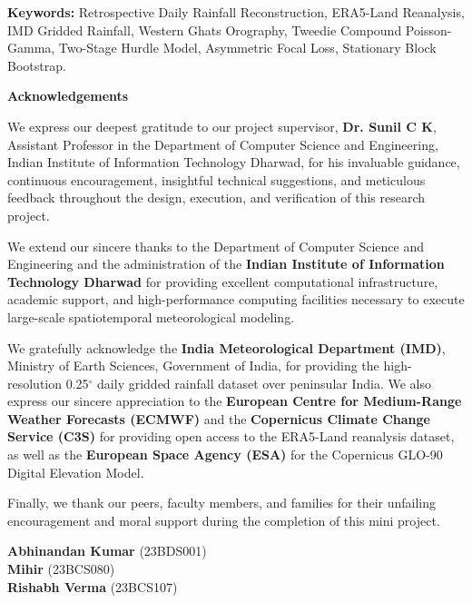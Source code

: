 \documentclass[12pt]{article}
\begin{document}
\vspace{0.8cm}
\noindent \textbf{Keywords:} Retrospective Daily Rainfall Reconstruction, ERA5-Land Reanalysis, IMD Gridded Rainfall, Western Ghats Orography, Tweedie Compound Poisson-Gamma, Two-Stage Hurdle Model, Asymmetric Focal Loss, Stationary Block Bootstrap.

\newpage
\thispagestyle{empty}

\begin{center}
	{\huge \textbf{Acknowledgements}}\\[1.0cm]
\end{center}

\noindent We express our deepest gratitude to our project supervisor, \textbf{Dr. Sunil C K}, Assistant Professor in the Department of Computer Science and Engineering, Indian Institute of Information Technology Dharwad, for his invaluable guidance, continuous encouragement, insightful technical suggestions, and meticulous feedback throughout the design, execution, and verification of this research project.

\vspace{0.6cm}
\noindent We extend our sincere thanks to the Department of Computer Science and Engineering and the administration of the \textbf{Indian Institute of Information Technology Dharwad} for providing excellent computational infrastructure, academic support, and high-performance computing facilities necessary to execute large-scale spatiotemporal meteorological modeling.

\vspace{0.6cm}
\noindent We gratefully acknowledge the \textbf{India Meteorological Department (IMD)}, Ministry of Earth Sciences, Government of India, for providing the high-resolution 0.25$^\circ$ daily gridded rainfall dataset over peninsular India. We also express our sincere appreciation to the \textbf{European Centre for Medium-Range Weather Forecasts (ECMWF)} and the \textbf{Copernicus Climate Change Service (C3S)} for providing open access to the ERA5-Land reanalysis dataset, as well as the \textbf{European Space Agency (ESA)} for the Copernicus GLO-90 Digital Elevation Model.

\vspace{0.6cm}
\noindent Finally, we thank our peers, faculty members, and families for their unfailing encouragement and moral support during the completion of this mini project.

\vspace{1.5cm}
\noindent \begin{flushright}
\textbf{Abhinandan Kumar} (23BDS001)\\
\textbf{Mihir} (23BCS080)\\
\textbf{Rishabh Verma} (23BCS107)\\
\end{flushright}
\end{document}
